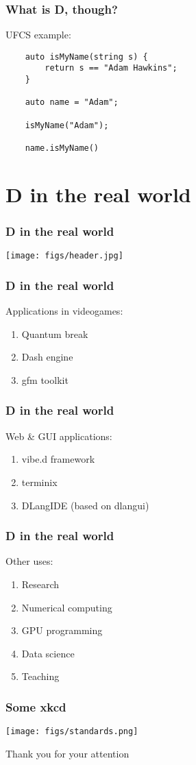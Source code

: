 \documentclass{beamer}
\begin{document}
\begin{frame}[fragile]
  \frametitle{What is D, though?}
  UFCS example:
  \begin{verbatim}
    auto isMyName(string s) {
        return s == "Adam Hawkins";
    }

    auto name = "Adam";

    isMyName("Adam");

    name.isMyName()
  \end{verbatim}
\end{frame}

\section{D in the real world}

\begin{frame}
  \frametitle{D in the real world}
  \texttt{[image: figs/header.jpg]}
\end{frame}

\begin{frame}
  \frametitle{D in the real world}
  Applications in videogames:
  \begin{enumerate}
    \item Quantum break
    \item Dash engine
    \item gfm toolkit
  \end{enumerate}
\end{frame}

\begin{frame}
  \frametitle{D in the real world}
  Web \& GUI applications:
  \begin{enumerate}
    \item vibe.d framework
    \item terminix
    \item DLangIDE (based on dlangui)
  \end{enumerate}
\end{frame}

\begin{frame}
  \frametitle{D in the real world}
  Other uses:
  \begin{enumerate}
    \item Research
    \item Numerical computing
    \item GPU programming
    \item Data science
    \item Teaching
  \end{enumerate}
\end{frame}

\begin{frame}
  \frametitle{Some xkcd}
  \texttt{[image: figs/standards.png]}
\end{frame}

\begin{frame}
  \begin{center}
    Thank you for your attention
  \end{center}
\end{frame}
\end{document}
